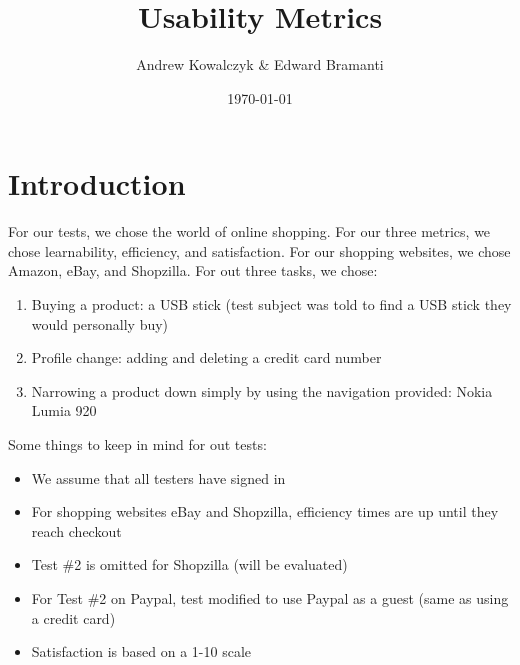 \documentclass[11pt, oneside]{article}   	%
\title{Usability Metrics}
\author{Andrew Kowalczyk \& Edward Bramanti}
\date{\today}							%
\begin{document}
\maketitle

\section{Introduction}
For our tests, we chose the world of online shopping. For our three metrics, we chose learnability, efficiency, and satisfaction. For our shopping websites, we chose Amazon, eBay, and Shopzilla. For out three tasks, we chose:

\begin{enumerate}
    \item Buying a product: a USB stick (test subject was told to find a USB stick they would personally buy)
    \item Profile change: adding and deleting a credit card number
    \item Narrowing a product down simply by using the navigation provided: Nokia Lumia 920
\end{enumerate}

Some things to keep in mind for out tests:

\begin{itemize}
    \item We assume that all testers have signed in
    \item For shopping websites eBay and Shopzilla, efficiency times are up until they reach checkout
    \item Test \#2 is omitted for Shopzilla (will be evaluated)
    \item For Test \#2 on Paypal, test modified to use Paypal as a guest (same as using a credit card)
    \item Satisfaction is based on a 1-10 scale
\end{itemize}
\end{document}
